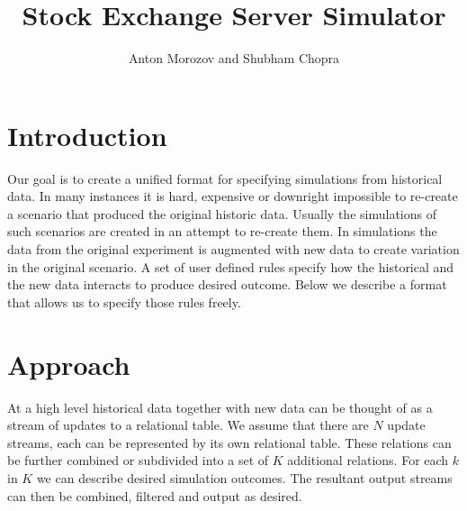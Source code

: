 \documentclass{article}
\begin{document}
    
\title{Stock Exchange Server Simulator}
\author{Anton Morozov and Shubham Chopra}
\maketitle
    
\section{Introduction}

Our goal is to create a unified format for specifying simulations from historical data. In many instances it is hard, expensive or downright impossible to re-create a scenario that produced the original historic data. Usually the simulations of such scenarios are created in an attempt to re-create them. In simulations the data from the original experiment is augmented with new data to create variation in the original scenario. A set of user defined rules specify how the historical and the new data interacts to produce desired outcome. Below we describe a format that allows us to specify those rules freely. 


\section{Approach}

At a high level historical data together with new data can be thought of as a stream of updates to a relational table. We assume that there are $N$ update streams, each can be represented by its own relational table. These relations can be further combined or subdivided into a set of $K$ additional relations. For each $k$ in $K$ we can describe desired simulation outcomes. The resultant output streams can then be combined, filtered and output as desired.


\end{document}
